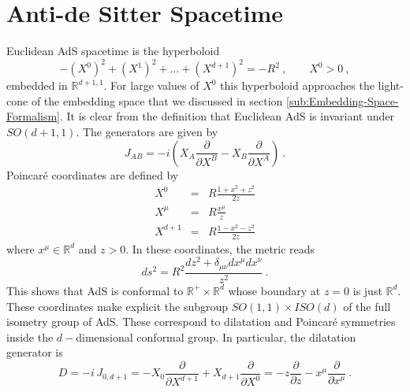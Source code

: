 \documentclass{ws-rv9x6}
\newcommand\be{\begin{equation}}
\newcommand\ee{\end{equation}}
\begin{document}
\section{Anti-de Sitter Spacetime \label{sec:AdS}}

Euclidean AdS spacetime is the hyperboloid 
\begin{equation}
-\left(X^{0}\right)^{2}+\left(X^{1}\right)^{2}+\dots+\left(X^{d+1}\right)^{2}=-R^{2}\ ,\qquad X^{0}>0\ ,\label{eq:EAdS}
\end{equation}
embedded in $\mathbb{R}^{d+1,1}$. For large values of $X^{0}$ this
hyperboloid approaches the light-cone of the embedding space that
we discussed in section \ref{sub:Embedding-Space-Formalism}. It is
clear from the definition that Euclidean AdS is invariant under $SO(d+1,1)$.
The generators are given by
\be
J_{AB}=-i\left(X_{A}\frac{\partial}{\partial X^{B}}-X_{B}\frac{\partial}{\partial X^{A}}\right)\ .
\ee
Poincaré coordinates are defined by 
\begin{eqnarray}
X^{0} & = & R \frac{1+x^{2}+z^{2}}{2z}\nonumber \\
X^{\mu} & = & R\frac{x^{\mu}}{z}\label{eq:AdSPoincareEmb}\\
X^{d+1} & = & R \frac{1-x^{2}-z^{2}}{2z}\nonumber 
\end{eqnarray}
where $x^{\mu}\in\mathbb{R}^{d}$ and $z>0$. In these coordinates,
the metric reads
\be
ds^{2}=R^{2}\frac{dz^{2}+\delta_{\mu\nu}dx^{\mu}dx^{\nu}}{z^{2}}\ .
\ee
This shows that AdS is conformal to $\mathbb{R}^{+}\times\mathbb{R}^{d}$
whose boundary at $z=0$ is just $\mathbb{R}^{d}$. These coordinates
make explicit the subgroup $SO(1,1)\times ISO(d)$ of the full isometry
group of AdS. These correspond to dilatation and Poincaré symmetries
inside the $d-$dimensional conformal group. In particular, the dilatation
generator is 
\be
D=-i\, J_{0,d+1}=-X_{0}\frac{\partial}{\partial X^{d+1}}+X_{d+1}\frac{\partial}{\partial X^{0}}=-z\frac{\partial}{\partial z}-x^{\mu}\frac{\partial}{\partial x^{\mu}}\ .
\ee
 
\end{document}
